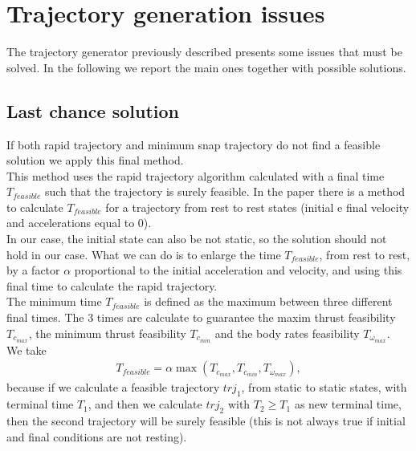 \section{Trajectory generation issues} \label{sec:trajectory_problem}
The trajectory generator previously described presents some issues that must be solved. In the following we report the main ones together with possible solutions.

\subsection{Last chance solution}
If both rapid trajectory and minimum snap trajectory do not find a feasible solution we apply this final method.\\

This method uses the rapid trajectory algorithm calculated with a final time $T_{feasible}$ such that the trajectory is surely feasible. In the paper \cite{mueller2015computationally} there is a method to calculate $T_{feasible}$ for a trajectory from rest to rest states (initial e final velocity and accelerations equal to 0).\\
In our case, the initial state can also be not static, so the solution should not hold in our case. What we can do is to enlarge the time $T_{feasible}$, from rest to rest, by a factor $\alpha$ proportional to the initial acceleration and velocity, and using this final time to calculate the rapid trajectory.\\

The minimum time $T_{feasible}$ is defined as the maximum between three different final times. The 3 times are calculate to guarantee the maxim thrust feasibility $T_{c_{max}}$, the minimum thrust feasibility $T_{c_{min}}$ and the body rates feasibility $T_{\omega_{max}}$. \\

We take 
\begin{align}
T_{feasible} = \alpha \max{(T_{c_{max}},T_{c_{min}},T_{\omega_{max}})},
\end{align}
because if  we calculate a feasible trajectory $trj_1$, from static to static states, with terminal time $T_1$, and then we calculate $trj_2$ with $T_2 \geq T_1$ as new terminal time, then the second trajectory will be surely feasible (this is not always true if initial and final conditions are not resting).\\

